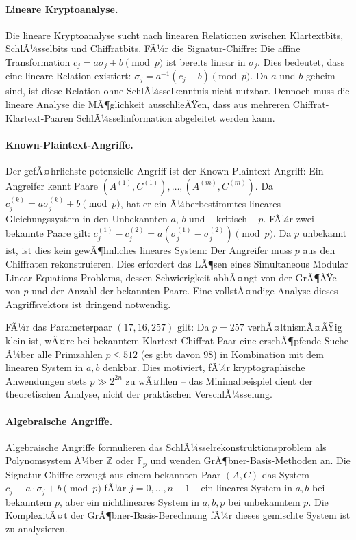 ﻿\documentclass[a4paper,12pt]{scrreprt}
\theoremstyle{definition}
\begin{document}
\paragraph{Lineare Kryptoanalyse.}
Die lineare Kryptoanalyse \cite{Mat94} sucht nach linearen Relationen zwischen Klartextbits, SchlÃ¼sselbits und Chiffratbits. FÃ¼r die Signatur-Chiffre: Die affine Transformation $c_j = a\sigma_j + b \pmod p$ ist bereits linear in $\sigma_j$. Dies bedeutet, dass eine lineare Relation existiert: $\sigma_j = a^{-1}(c_j - b) \pmod p$. Da $a$ und $b$ geheim sind, ist diese Relation ohne SchlÃ¼sselkenntnis nicht nutzbar. Dennoch muss die lineare Analyse die MÃ¶glichkeit ausschlieÃŸen, dass aus mehreren Chiffrat-Klartext-Paaren SchlÃ¼sselinformation abgeleitet werden kann.

\paragraph{Known-Plaintext-Angriffe.}
Der gefÃ¤hrlichste potenzielle Angriff ist der Known-Plaintext-Angriff: Ein Angreifer kennt Paare $(A^{(1)}, C^{(1)}), \ldots, (A^{(m)}, C^{(m)})$. Da $c_j^{(k)} = a\sigma_j^{(k)} + b \pmod p$, hat er ein Ã¼berbestimmtes lineares Gleichungssystem in den Unbekannten $a$, $b$ und -- kritisch -- $p$. FÃ¼r zwei bekannte Paare gilt: $c_j^{(1)} - c_j^{(2)} = a(\sigma_j^{(1)} - \sigma_j^{(2)}) \pmod p$. Da $p$ unbekannt ist, ist dies kein gewÃ¶hnliches lineares System: Der Angreifer muss $p$ aus den Chiffraten rekonstruieren. Dies erfordert das LÃ¶sen eines Simultaneous Modular Linear Equations-Problems, dessen Schwierigkeit abhÃ¤ngt von der GrÃ¶ÃŸe von $p$ und der Anzahl der bekannten Paare. Eine vollstÃ¤ndige Analyse dieses Angriffsvektors ist dringend notwendig.

FÃ¼r das Parameterpaar $(17, 16, 257)$ gilt: Da $p = 257$ verhÃ¤ltnismÃ¤ÃŸig klein ist, wÃ¤re bei bekanntem Klartext-Chiffrat-Paar eine erschÃ¶pfende Suche Ã¼ber alle Primzahlen $p \leq 512$ (es gibt davon $98$) in Kombination mit dem linearen System in $a, b$ denkbar. Dies motiviert, fÃ¼r kryptographische Anwendungen stets $p \gg 2^{2n}$ zu wÃ¤hlen -- das Minimalbeispiel dient der theoretischen Analyse, nicht der praktischen VerschlÃ¼sselung.

\paragraph{Algebraische Angriffe.}
Algebraische Angriffe formulieren das SchlÃ¼sselrekonstruktionsproblem als Polynomsystem Ã¼ber $\mathbb{Z}$ oder $\mathbb{F}_p$ und wenden GrÃ¶bner-Basis-Methoden an. Die Signatur-Chiffre erzeugt aus einem bekannten Paar $(A, C)$ das System $c_j \equiv a \cdot \sigma_j + b \pmod p$ fÃ¼r $j = 0,\ldots,n-1$ -- ein lineares System in $a, b$ bei bekanntem $p$, aber ein nichtlineares System in $a, b, p$ bei unbekanntem $p$. Die KomplexitÃ¤t der GrÃ¶bner-Basis-Berechnung fÃ¼r dieses gemischte System ist zu analysieren.
\end{document}
